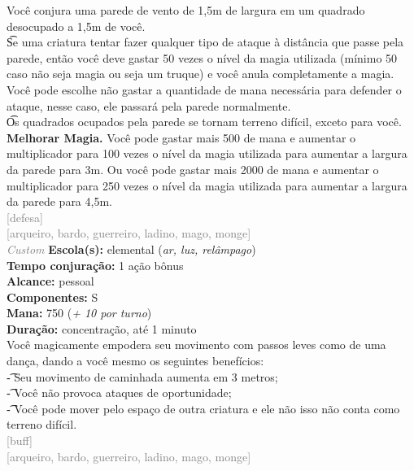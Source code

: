 \documentclass{RPG_Adventure}[2021/10/20]
\begin{document}
{\normalsize Você conjura uma parede de vento de 1,5m de largura em um quadrado desocupado a 1,5m de você.\\\t Se uma criatura tentar fazer qualquer tipo de ataque à distância que passe pela parede, então você deve gastar 50 vezes o nível da magia utilizada (mínimo 50 caso não seja magia ou seja um truque) e você anula completamente a magia. Você pode escolhe não gastar a quantidade de mana necessária para defender o ataque, nesse caso, ele passará pela parede normalmente.\\\t Os quadrados ocupados pela parede se tornam terreno difícil, exceto para você.\\\t \textbf{Melhorar Magia.} Você pode gastar mais 500 de mana e aumentar o multiplicador para 100 vezes o nível da magia utilizada para aumentar a largura da parede para 3m. Ou você pode gastar mais 2000 de mana e aumentar o multiplicador para 250 vezes o nível da magia utilizada para aumentar a largura da parede para 4,5m.\\}
{\scriptsize \textcolor{gray}{[defesa]\\}}
{\scriptsize \textcolor{gray}{[arqueiro, bardo, guerreiro, ladino, mago, monge]\\}}
{\tiny \textcolor{gray}{\textit{Custom}}}
{\small \t \textbf{Escola(s):} elemental (\textit{ar, luz, relâmpago})\\\t \textbf{Tempo conjuração:} 1 ação bônus\\\t \textbf{Alcance:} pessoal\\\t \textbf{Componentes:} S\\\t \textbf{Mana:} 750 (\textit{+ 10 por turno})\\\t \textbf{Duração:} concentração, até 1 minuto\\}
{\normalsize Você magicamente empodera seu movimento com passos leves como de uma dança, dando a você mesmo os seguintes benefícios:\\\t - Seu movimento de caminhada aumenta em 3 metros;\\\t - Você não provoca ataques de oportunidade;\\\t - Você pode mover pelo espaço de outra criatura e ele não isso não conta como terreno difícil.\\}
{\scriptsize \textcolor{gray}{[buff]\\}}
{\scriptsize \textcolor{gray}{[arqueiro, bardo, guerreiro, ladino, mago, monge]\\}}
\end{document}
